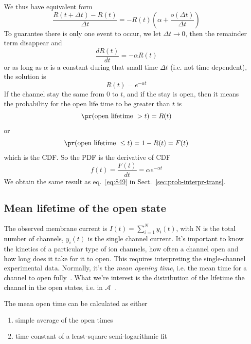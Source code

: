 We thus have equivalent form
\begin{equation}
  \label{eq:895}
  \frac{ R(t+\Delta t) - R(t)}{\Delta t} = -R(t)\left(\alpha  +
      \frac{o(\Delta t)}{\Delta t}\right)
\end{equation}
To guarantee there is only one event to occur, we let $\Delta
t\rightarrow 0$, then the remainder term disappear and
\begin{equation}
  \label{eq:896}
  \frac{dR(t)}{dt} = -\alpha R(t)
\end{equation}
or as long as $\alpha$ is a constant during that small time $\Delta t$ (i.e. not
time dependent), the solution is
\begin{equation}
  \label{eq:897}
  R(t) = e^{-\alpha t}
\end{equation}
If the channel stay the same from 0 to $t$, and if the stay is open,
then it means the probability for the open life time to be greater
than $t$ is
\begin{equation}
  \label{eq:898}
  \pr(\text{open lifetime } > t) = R(t)
\end{equation}
or
\begin{equation}
  \label{eq:899}
  \pr(\text{open lifetime } \le t) = 1 - R(t) = F(t)
\end{equation}
which is the CDF. So the PDF is the derivative of CDF
\begin{equation}
  \label{eq:900}
  f(t) = \frac{F(t)}{dt} = \alpha e^{-\alpha t}
\end{equation}
We obtain the same result as eq.~\eqref{eq:849} in
Sect.~\ref{sec:prob-interpr-trans}.

\subsection{Mean lifetime of the open state}
\label{sec:dwell-time-mean}

The observed membrane current is $I(t) = \sum^N_{i=1}y_i(t)$, with N is the
total number of channels, $y_i(t)$ is the single channel current.  It's
important to know the kinetics of a particular type of ion channels, how often a
channel open and how long does it take for it to open. This requires
interpreting the single-channel experimental data. Normally, it's the {\it mean
opening time}, i.e. the mean time for a channel to open
fully~\citep{magleby1990ekp}.  What we're interest is the distribution of the
lifetime the channel in the open states, i.e. in
$\mathcal{A}$~\citep{colquhoun1981sps}.

The mean open time can be calculated as either
\begin{enumerate}
  \item simple average of the open times
  \item time constant of a least-square semi-logarithmic fit
\end{enumerate}


